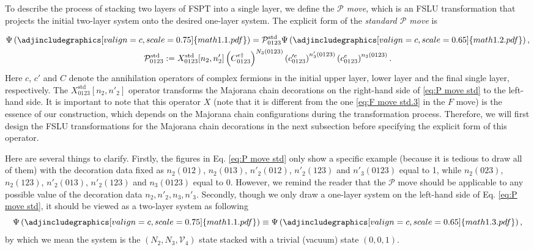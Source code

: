 \documentclass[%
 reprint,
 amsmath,amssymb,
 aps,
prb,
]{revtex4-2}
\begin{document}
To describe the process of stacking two layers of FSPT into a single layer, we define the \textit{$\mathcal P$ move}, which is an FSLU transformation that projects the initial two-layer system onto the desired one-layer system.
The explicit form of the \textit{standard $\mathcal P$ move} is 
\begin{widetext}
\begin{gather}
\Psi \left( \adjincludegraphics[valign=c,scale=0.75]{math1.1.pdf} \right) 
=\mathcal{P}_{0123}^{\mathrm{std}} \Psi \left( \adjincludegraphics[valign=c,scale=0.65]{math1.2.pdf} \right) ,\label{eq:P move std}\\
\mathcal{P}_{0123}^{\mathrm{std}} := X_{0123}^{\mathrm{std}}[ n_{2} ,n'_{2}]\left( C_{0123}^{e\dagger }\right)^{N_{3}( 0123)}\left( c^{\prime e}_{0123}\right)^{n'_{3}( 0123)}\left( c_{0123}^{e}\right)^{n_{3}( 0123)} .\label{eq:P move std.1}
\end{gather}
Here $c$, $c'$ and $C$ denote the annihilation operators of complex fermions in the initial upper layer, lower layer and the final single layer, respectively.
The $X_{0123}^{\mathrm{std}}[ n_{2} ,n'_{2}]$ operator transforms the Majorana chain decorations on the right-hand side of \eqref{eq:P move std} to the left-hand side.
It is important to note that this operator $X$ (note that it is different from the one \eqref{eq:F move std.3} in the $F$ move) is the essence of our construction, which depends on the Majorana chain configurations during the transformation process.
Therefore, we will first design the FSLU transformations for the Majorana chain decorations in the next subsection before specifying the explicit form of this operator.

Here are several things to clarify.
Firstly, the figures in Eq. \eqref{eq:P move std} only show a specific example (because it is tedious to draw all of them) with the decoration data fixed as $n_2(012)$, $n_2(013)$, $n'_2(012)$, $n'_2(123)$ and $n'_3(0123)$ equal to 1, while $n_2(023)$, $n_2(123)$, $n'_2(013)$, $n'_2(123)$ and $n_3(0123)$ equal to 0.
However, we remind the reader that the $\mathcal P$ move should be applicable to any possible value of the decoration data $n_2, n'_2, n_3, n'_3$.
Secondly, though we only draw a one-layer system on the left-hand side of Eq. \eqref{eq:P move std}, it should be viewed as a two-layer system as following 
\begin{equation}
\Psi \left( \adjincludegraphics[valign=c,scale=0.75]{math1.1.pdf} \right) \equiv 
\Psi \left( \adjincludegraphics[valign=c,scale=0.65]{math1.3.pdf} \right) ,
\end{equation}
by which we mean the system is the $(N_2, N_3, \mathcal V_4)$ state stacked with a trivial (vacuum) state $(0,0,1)$.


\end{widetext}
\end{document}
